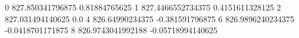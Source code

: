 0 827.850341796875 0.81884765625
1 827.4466552734375 0.4151611328125
2 827.031494140625 0.0
4 826.64990234375 -0.381591796875
6 826.9896240234375 -0.0418701171875
8 826.9743041992188 -0.05718994140625
